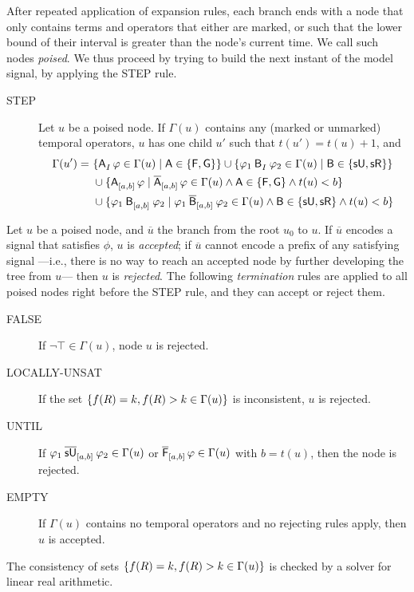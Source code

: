 \documentclass[acmsmall,screen]{acmart}
\begin{document}
After repeated application of expansion rules, each branch ends with a node
that only contains terms and operators that either are marked,
or such that the lower bound of their interval is greater than the node's current time.
We call such nodes \emph{poised}.
We thus proceed by trying to build the next instant of the model signal, by applying the \textsf{STEP} rule.
\begin{description}
\item[\textsf{STEP}]
Let $u$ be a poised node.
If $\Gamma(u)$ contains any (marked or unmarked) temporal operators,
$u$ has one child $u'$ such that $t(u') = t(u) + 1$, and
\begin{align*}
\Gamma(u') =
\ & \set{\anyunop{I}{\varphi} \in \Gamma(u) \mid \mathsf{A} \in \set{\evenop, \globop}}
\cup \set{\anybinop{I}{\varphi_1}{\varphi_2} \in \Gamma(u) \mid \mathsf{B} \in \set{\suntilop, \sreleaseop}} \\
&\cup \set{\anyunop{[a,b]}{\varphi} \mid \stlunop{\marked{\mathsf{A}}}{[a,b]}{\varphi} \in \Gamma(u) \land \mathsf{A} \in \set{\evenop, \globop} \land t(u) < b} \\
&\cup
\set{\anybinop{[a,b]}{\varphi_1}{\varphi_2} \mid \stlbinop{\marked{\mathsf{B}}}{[a,b]}{\varphi_1}{\varphi_2} \in \Gamma(u) \land \mathsf{B} \in \set{\suntilop, \sreleaseop} \land t(u) < b}
\end{align*}
\end{description}

Let $u$ be a poised node, and $\overline{u}$ the branch from the root $u_0$ to $u$.
If $\overline{u}$ encodes a signal that satisfies $\phi$, $u$ is \emph{accepted};
if $\overline{u}$ cannot encode a prefix of any satisfying signal%
---i.e., there is no way to reach an accepted node by further developing the tree from $u$---%
then $u$ is \emph{rejected}.
The following \emph{termination} rules are applied to all poised nodes right before the \textsf{STEP} rule,
and they can accept or reject them.
\begin{description}
\item[\textsf{FALSE}] If $\neg \top \in \Gamma(u)$, node $u$ is rejected.

\item[\textsf{LOCALLY-UNSAT}]
If the set $\set{f(R) = k, f(R) > k \in \Gamma(u)}$ is inconsistent, $u$ is rejected.

\item[\textsf{UNTIL}]
If $\msuntil{[a,b]}{\varphi_1}{\varphi_2} \in \Gamma(u)$ or $\meven{[a,b]} \varphi \in \Gamma(u)$ with $b = t(u)$, then the node is rejected.

\item[\textsf{EMPTY}]
If $\Gamma(u)$ contains no temporal operators and no rejecting rules apply,
then $u$ is accepted.
\end{description}
The consistency of sets $\set{f(R) = k, f(R) > k \in \Gamma(u)}$ is checked by a solver for linear real arithmetic.
\end{document}
